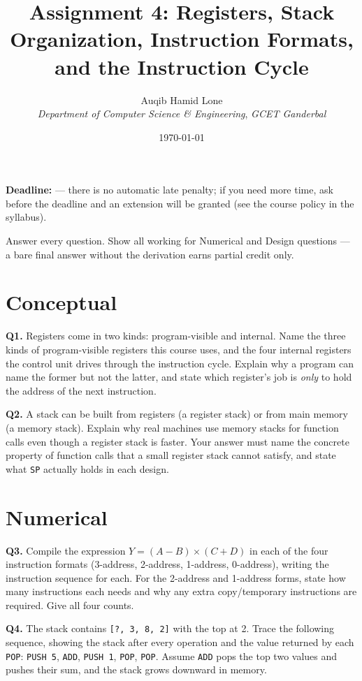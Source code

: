 \documentclass[11pt]{article}
\title{Assignment 4: Registers, Stack Organization, Instruction Formats, and the Instruction Cycle}
\author{Auqib Hamid Lone\\[0.3em]
  \emph{Department of Computer Science \& Engineering}, \emph{GCET Ganderbal}}
\date{\today}
\begin{document}
\maketitle

\noindent\textbf{Deadline:}  --- there is no automatic late penalty; if you need more time, ask before the deadline and an extension will be granted (see the course policy in the syllabus).

\noindent Answer every question. Show all working for Numerical and Design questions --- a bare final answer without the derivation earns partial credit only.

\section{Conceptual}

\textbf{Q1.} Registers come in two kinds: program-visible and internal. Name the three kinds of program-visible registers this course uses, and the four internal registers the control unit drives through the instruction cycle. Explain why a program can name the former but not the latter, and state which register's job is \emph{only} to hold the address of the next instruction.

\textbf{Q2.} A stack can be built from registers (a register stack) or from main memory (a memory stack). Explain why real machines use memory stacks for function calls even though a register stack is faster. Your answer must name the concrete property of function calls that a small register stack cannot satisfy, and state what \texttt{SP} actually holds in each design.

\section{Numerical}

\textbf{Q3.} Compile the expression $Y = (A - B) \times (C + D)$ in each of the four instruction formats (3-address, 2-address, 1-address, 0-address), writing the instruction sequence for each. For the 2-address and 1-address forms, state how many instructions each needs and why any extra copy/temporary instructions are required. Give all four counts.

\textbf{Q4.} The stack contains \texttt{[?, 3, 8, 2]} with the top at 2. Trace the following sequence, showing the stack after every operation and the value returned by each \texttt{POP}: \texttt{PUSH 5}, \texttt{ADD}, \texttt{PUSH 1}, \texttt{POP}, \texttt{POP}. Assume \texttt{ADD} pops the top two values and pushes their sum, and the stack grows downward in memory.
\end{document}
